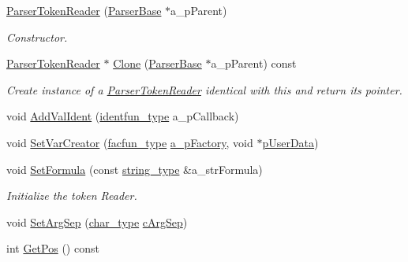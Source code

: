 \begin{DoxyCompactItemize}
\item 
\hyperlink{classmu_1_1_parser_token_reader_a1e72a60fc0bfccf885a066ed0578922d}{Parser\+Token\+Reader} (\hyperlink{classmu_1_1_parser_base}{Parser\+Base} $\ast$a\+\_\+p\+Parent)
\begin{DoxyCompactList}\small\item\em Constructor. \end{DoxyCompactList}\item 
\hyperlink{classmu_1_1_parser_token_reader}{Parser\+Token\+Reader} $\ast$ \hyperlink{classmu_1_1_parser_token_reader_ac5ed05f986cfd6ab28f802e22937f0b5}{Clone} (\hyperlink{classmu_1_1_parser_base}{Parser\+Base} $\ast$a\+\_\+p\+Parent) const 
\begin{DoxyCompactList}\small\item\em Create instance of a \hyperlink{classmu_1_1_parser_token_reader}{Parser\+Token\+Reader} identical with this and return its pointer. \end{DoxyCompactList}\item 
void \hyperlink{classmu_1_1_parser_token_reader_ae7c87757b4244e20b2c32c4173cc8284}{Add\+Val\+Ident} (\hyperlink{namespacemu_a0e40974644c0e6488d76229ca0f4ce23}{identfun\+\_\+type} a\+\_\+p\+Callback)
\item 
void \hyperlink{classmu_1_1_parser_token_reader_a6275551cf90f88ee6e0b992cc8027fb2}{Set\+Var\+Creator} (\hyperlink{namespacemu_a97af5f5c39391d262dda72084788b83e}{facfun\+\_\+type} \hyperlink{mu_parser_d_l_l_8h_af7bdd6658661ca9fa9e157a21f70d550}{a\+\_\+p\+Factory}, void $\ast$\hyperlink{mu_parser_d_l_l_8h_af2fe0b3322818bbb3e6f8b0457f1b802}{p\+User\+Data})
\item 
void \hyperlink{classmu_1_1_parser_token_reader_a73c2f7d995520961afe22c9f3f4113d7}{Set\+Formula} (const \hyperlink{namespacemu_ae9f8b44d9a97dd397180891e8390c3e9}{string\+\_\+type} \&a\+\_\+str\+Formula)
\begin{DoxyCompactList}\small\item\em Initialize the token Reader. \end{DoxyCompactList}\item 
void \hyperlink{classmu_1_1_parser_token_reader_a5c6df951c19e7cbbe381312a15ab3ddc}{Set\+Arg\+Sep} (\hyperlink{namespacemu_a81cc89a81a8872430ab1799b5848c5ca}{char\+\_\+type} \hyperlink{mu_parser_d_l_l_8h_a76c4c148d54d5b7e5728ec911432a1c3}{c\+Arg\+Sep})
\item 
int \hyperlink{classmu_1_1_parser_token_reader_ac539d94917cbcb9ac1b0a9f62128ddba}{Get\+Pos} () const 

\end{DoxyCompactItemize}
